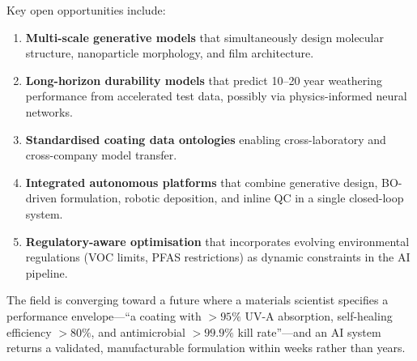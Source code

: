\documentclass[11pt,a4paper]{article}
\begin{document}
Key open opportunities include:
\begin{enumerate}[nosep]
  \item \textbf{Multi-scale generative models} that simultaneously design molecular structure, nanoparticle morphology, and film architecture.
  \item \textbf{Long-horizon durability models} that predict 10--20 year weathering performance from accelerated test data, possibly via physics-informed neural networks.
  \item \textbf{Standardised coating data ontologies} enabling cross-laboratory and cross-company model transfer.
  \item \textbf{Integrated autonomous platforms} that combine generative design, BO-driven formulation, robotic deposition, and inline QC in a single closed-loop system.
  \item \textbf{Regulatory-aware optimisation} that incorporates evolving environmental regulations (VOC limits, PFAS restrictions) as dynamic constraints in the AI pipeline.
\end{enumerate}

The field is converging toward a future where a materials scientist specifies a performance envelope---``a coating with $>95\%$ UV-A absorption, self-healing efficiency $>80\%$, and antimicrobial $>99.9\%$ kill rate''---and an AI system returns a validated, manufacturable formulation within weeks rather than years.
\end{document}
